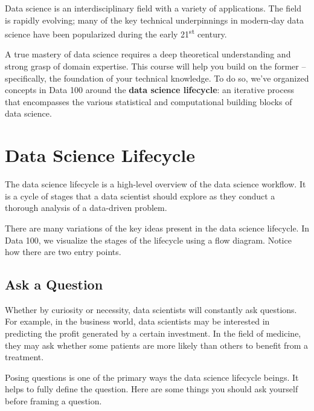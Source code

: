 \documentclass[
  letterpaper,
  DIV=11,
  numbers=noendperiod]{scrreprt}
\begin{document}
Data science is an interdisciplinary field with a variety of
applications. The field is rapidly evolving; many of the key technical
underpinnings in modern-day data science have been popularized during
the early 21\textsuperscript{st} century.

A true mastery of data science requires a deep theoretical understanding
and strong grasp of domain expertise. This course will help you build on
the former -- specifically, the foundation of your technical knowledge.
To do so, we've organized concepts in Data 100 around the \textbf{data
science lifecycle}: an iterative process that encompasses the various
statistical and computational building blocks of data science.

\hypertarget{data-science-lifecycle}{%
\section{Data Science Lifecycle}\label{data-science-lifecycle}}

The data science lifecycle is a high-level overview of the data science
workflow. It is a cycle of stages that a data scientist should explore
as they conduct a thorough analysis of a data-driven problem.

There are many variations of the key ideas present in the data science
lifecycle. In Data 100, we visualize the stages of the lifecycle using a
flow diagram. Notice how there are two entry points.

\hypertarget{ask-a-question}{%
\subsection{Ask a Question}\label{ask-a-question}}

Whether by curiosity or necessity, data scientists will constantly ask
questions. For example, in the business world, data scientists may be
interested in predicting the profit generated by a certain investment.
In the field of medicine, they may ask whether some patients are more
likely than others to benefit from a treatment.

Posing questions is one of the primary ways the data science lifecycle
beings. It helps to fully define the question. Here are some things you
should ask yourself before framing a question.
\end{document}
